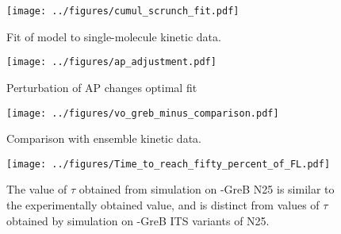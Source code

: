\begin{figure}
    \begin{center}
        \texttt{[image: ../figures/cumul\_scrunch\_fit.pdf]}
    \end{center}
    \caption{Fit of model to single-molecule kinetic data.}
\label{fig:revyakin_fit}
\end{figure}


\begin{figure}
    \begin{center}
        \texttt{[image: ../figures/ap\_adjustment.pdf]}
    \end{center}
    \caption{Perturbation of AP changes optimal fit}
\label{fig:ap_adjustment}
\end{figure}

\begin{figure}
    \begin{center}
        \texttt{[image: ../figures/vo\_greb\_minus\_comparison.pdf]}
    \end{center}
    \caption{Comparison with ensemble kinetic data.}
\label{fig:vo_comparison}
\end{figure}

\begin{figure}
    \begin{center}
        \texttt{[image: ../figures/Time\_to\_reach\_fifty\_percent\_of\_FL.pdf]}
    \end{center}
    \caption{The value of $\tau$ obtained from simulation on -GreB N25 is
    similar to the experimentally obtained value, and is distinct from values of
    $\tau$ obtained by simulation on -GreB ITS variants of N25.}
\label{fig:vo_comparison}
\end{figure}


